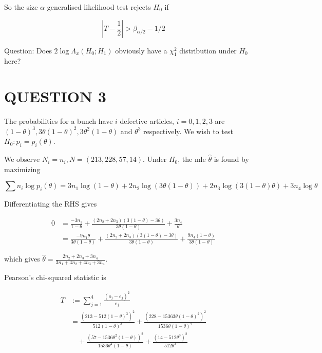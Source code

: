 \documentclass[a4paper]{article}
\begin{document}
So the size $ \alpha $ generalised likelihood test rejects $ H_{0} $ if 

\[ \left| T - \frac{1}{2} \right| > \beta_{\alpha/2} - 1/2 \]

Question: Does $ 2 \log \Lambda_{x}(H_{0} ; H_{1}) $ obviously have a $ \chi_{1}^{2} $ distribution under $ H_{0} $ here?









\section{QUESTION 3}




The probabilities for a bunch have $ i $ defective articles, $ i = 0,1,2,3 $ are $ (1-\theta)^{3}, 3 \theta (1 - \theta)^{2}, 3 \theta^{2} (1- \theta) $ and $ \theta^{3} $ respectively.  We wish to test $ H_{0}: p_{i} = p_{i}(\theta) $.



We observe $ N_{i} = n_{i}, N = ( 213,228,57,14)  $. Under $ H_{0} $, the mle $ \hat{\theta} $ is found by maximizing

\[ \sum n_{i} \log p_{i} (\theta) = 3 n_{1} \log(1 - \theta) + 2 n_{2} \log(3 \theta(1-\theta)) + 2 n_{3} \log ( 3(1 - \theta)\theta ) + 3 n_{4} \log \theta \]

Differentiating the RHS gives

\begin{align*}
0 & =  \frac{-3n_{1}}{1 - \theta} + \frac{(2n_{2} + 2n_{3})(3(1-\theta) - 3 \theta )  }{3 \theta(1-\theta)} + \frac{3n_{4}}{\theta} \\
& = \frac{-9n_{1} \theta}{3 \theta(1-\theta)} + \frac{(2n_{2} + 2n_{3})(3(1-\theta) - 3 \theta )  }{3 \theta(1-\theta)} + \frac{9n_{4}(1 - \theta)}{3 \theta(1-\theta)}
\end{align*}

which gives $ \hat{\theta} = \frac{2n_{2} + 2n_{3} + 3n_{4}}{3 n_{1} + 4n_{2} + 4n_{3} + 3n_{4}} $.

 Pearson's chi-squared statistic is

\begin{align*}
T & := \sum_{j=1}^{4} \frac{(o_{j} - e_{j})^{2}}{e_{j}} \\
& = \frac{(213 - 512(1-\theta)^{3})^{2}}{512(1-\theta)^{3}} + \frac{(228 - 1536 3 \theta (1 - \theta)^{2} )^{2}}{1536 \theta (1 - \theta)^{2}} \\
& \quad + \frac{(57 - 1536 \theta^{2} (1- \theta))^{2}}{1536 \theta^{2} (1- \theta)} + \frac{(14 - 512 \theta^{3} )^{2}}{512 \theta^{3}}
\end{align*}
\end{document}
